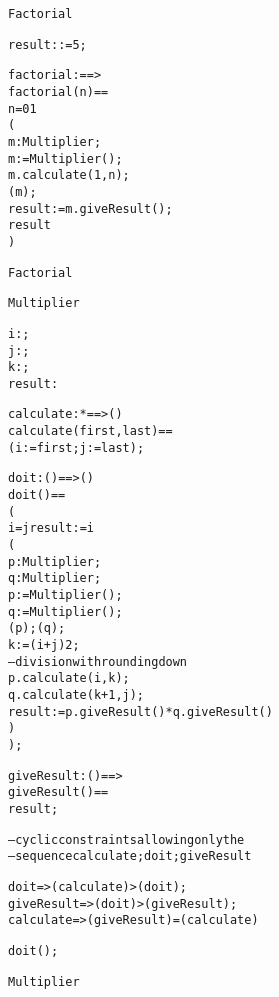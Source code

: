 \documentclass[\pformat,12pt]{article}
\begin{document}
\begin{description}
\begin{alltt}
     Factorial

     
      result :  := 5;

     factorial :  ==> 
    factorial(n) == 
       n = 0   1
       (
         m : Multiplier;
        m :=  Multiplier();
        m.calculate(1,n);
        (m);
        result:= m.giveResult();
         result
      )

     Factorial

     Multiplier

     
      i : ;
      j : ; 
      k : ;  
      result : 


     calculate :  *  ==> ()
    calculate (first, last) ==  
      (i := first; j := last);

    doit : () ==> ()
    doit() ==
      (
         i = j  result := i
        (
          p : Multiplier;
          q : Multiplier;
         p :=  Multiplier();  
         q :=  Multiplier();  
         (p);(q);  
         k := (i + j)   2;
         -- division with rounding down
         p.calculate(i,k);  
         q.calculate(k+1,j);  
         result := p.giveResult() *  q.giveResult ()
        )
      );

     giveResult : () ==> 
    giveResult() ==  
       result;

    -- cyclic constraints allowing only the 
    -- sequence calculate; doit; giveResult

     doit =>  (calculate) > (doit);
     giveResult =>  (doit) >  (giveResult);
     calculate =>  (giveResult) =  (calculate)

      doit();

     Multiplier
\end{alltt}

        


\end{description}
\end{document}
